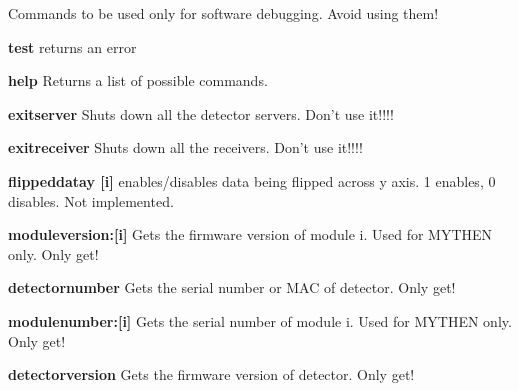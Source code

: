 Commands to be used only for software debugging. Avoid using them!
\begin{DoxyItemize}
\item {\bfseries test} returns an error
\end{DoxyItemize}


\begin{DoxyItemize}
\item {\bfseries help} Returns a list of possible commands.
\end{DoxyItemize}


\begin{DoxyItemize}
\item {\bfseries exitserver} Shuts down all the detector servers. Don't use it!!!!
\end{DoxyItemize}


\begin{DoxyItemize}
\item {\bfseries exitreceiver} Shuts down all the receivers. Don't use it!!!!
\end{DoxyItemize}


\begin{DoxyItemize}
\item {\bfseries flippeddatay \mbox{[}i\mbox{]}} enables/disables data being flipped across y axis. 1 enables, 0 disables. Not implemented.
\end{DoxyItemize}


\begin{DoxyItemize}
\item {\bfseries moduleversion:\mbox{[}i\mbox{]}} Gets the firmware version of module i. Used for MYTHEN only. Only get!
\end{DoxyItemize}


\begin{DoxyItemize}
\item {\bfseries detectornumber} Gets the serial number or MAC of detector. Only get!
\end{DoxyItemize}


\begin{DoxyItemize}
\item {\bfseries modulenumber:\mbox{[}i\mbox{]}} Gets the serial number of module i. Used for MYTHEN only. Only get!
\end{DoxyItemize}


\begin{DoxyItemize}
\item {\bfseries detectorversion} Gets the firmware version of detector. Only get!
\end{DoxyItemize}


